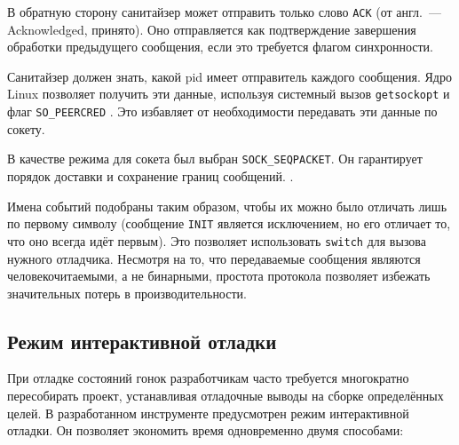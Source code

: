 В обратную сторону санитайзер может отправить только слово \texttt{ACK} (от англ.~--- Acknowledged, принято). Оно отправляется как подтверждение завершения обработки предыдущего сообщения, если это требуется флагом синхронности.

Санитайзер должен знать, какой pid имеет отправитель каждого сообщения. Ядро Linux позволяет получить эти данные, используя системный вызов \texttt{getsockopt} и флаг \texttt{SO\_PEERCRED} \cite{seqpacket}. Это избавляет от необходимости передавать эти данные по сокету.

В качестве режима для сокета был выбран \texttt{SOCK\_SEQPACKET}. Он гарантирует порядок доставки и сохранение границ сообщений. \cite{seqpacket}.

Имена событий подобраны таким образом, чтобы их можно было отличать лишь по первому символу (сообщение \texttt{INIT} является исключением, но его отличает то, что оно всегда идёт первым). Это позволяет использовать \texttt{switch} для вызова нужного отладчика. Несмотря на то, что передаваемые сообщения являются человекочитаемыми, а не бинарными, простота протокола позволяет избежать значительных потерь в производительности.

\subsection{Режим интерактивной отладки}

При отладке состояний гонок разработчикам часто требуется многократно пересобирать проект, устанавливая отладочные выводы на сборке определённых целей. В разработанном инструменте предусмотрен режим интерактивной отладки. Он позволяет экономить время одновременно двумя способами:

